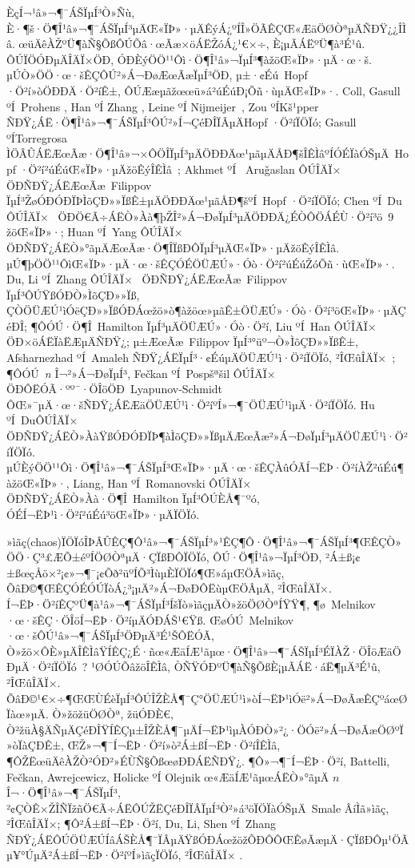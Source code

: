 \documentclass[12pt,openany,CJK,oneside]{cctbook}
\begin{document}
{ÈçÍ¬¹â»¬¶¯ÁŠÏµÍ³Ò»Ñù, È·¶š·Ö¶Î¹â»¬¶¯ÁŠÏµÍ³µÄŒ«ÏÞ»·µÄÊýÁ¿ºÍÎ»ÖÃÊÇŒ«ÆäÖØÒªµÄÑÐŸ¿¿ÎÌâ. œüÄêÀŽºÜ¶àÑ§ÕßÔÚÕâ·œÃæ×öÁËŽóÁ¿¹€×÷, È¡µÃÁËºÜ¶à³É¹û. ÔÚÏÖÓÐµÄÎÄÏ×ÖÐ, ÓÐÈýÖÖ¹¹Ôì·Ö¶Î¹â»¬ÏµÍ³¶àžöŒ«ÏÞ»·µÄ·œ·š. µÚÒ»ÖÖ·œ·šÊÇÔÚ²»Á¬ÐøÆœÃæÏµÍ³ÖÐ, µ±·¢Éú\ Hopf ·Ö²í»òÖÐÐÄ·Ö²íÊ±, ÔÚÆæµãžœœü»á²úÉúÐ¡Õñ·ùµÄŒ«ÏÞ»·. Coll, Gasull ºÍ\ Prohens \cite{Coll}, Han ºÍ Zhang \cite{Han}, Leine ºÍ Nijmeijer\ \cite{Leine}, Zou ºÍKš¹pper\ \cite{Zou} ÑÐŸ¿ÁË·Ö¶Î¹â»¬¶¯ÁŠÏµÍ³ÔÚ²»Í¬ÇéÐÎÏÂµÄHopf ·Ö²íÏÖÏó; Gasull ºÍTorregrosa ÌÖÂÛÁËÆœÃæ·Ö¶Î¹â»¬×ÔÖÎÏµÍ³µÄÖÐÐÄœ¹µãµÄÅÐ¶šÎÊÌâºÍÓÉÏàÓŠµÄ\ Hopf ·Ö²í²úÉúŒ«ÏÞ»·µÄžöÊýÎÊÌâ\ \cite{Gasull}; Akhmet ºÍ \ Aru\v{g}aslan ÔÚÎÄÏ×\ \cite{Akhmet} ÖÐÑÐŸ¿ÁËÆœÃæ\ Filippov ÏµÍ³ŽøÓÐÓÐÏÞÌõÇÐ»»ÏßÊ±µÄÖÐÐÄœ¹µãÅÐ¶šºÍ\ Hopf ·Ö²íÏÖÏó; Chen ºÍ\ Du ÔÚÎÄÏ×\ \cite{Chen} ÖÐÖ€Ã÷ÁËÒ»Àà¶þŽÎ²»Á¬ÐøÏµÍ³µÄÖÐÐÄ¿ÉÒÔÖÁÉÙ·Ö²í³ö\ 9 žöŒ«ÏÞ»·; Huan ºÍ\ Yang ÔÚÎÄÏ×\ \cite{Huan} ÖÐÑÐŸ¿ÁËÒ»°ãµÄÆœÃæ·Ö¶ÎÏßÐÔÏµÍ³µÄŒ«ÏÞ»·µÄžöÊýÎÊÌâ. µÚ¶þÖÖ¹¹ÔìŒ«ÏÞ»·µÄ·œ·šÊÇÓÉÖÜÆÚ»·Óò·Ö²í²úÉúŽóÕñ·ùŒ«ÏÞ»·. Du, Li ºÍ\ Zhang ÔÚÎÄÏ×\ \cite{DuLi,Dulizhang0} ÖÐÑÐŸ¿ÁËÆœÃæ\ Filippov ÏµÍ³ÔÚŸßÓÐÒ»ÌõÇÐ»»Ïß, ÇÒÖÜÆÚ¹ìÓëÇÐ»»ÏßÓÐÁœžö»ò¶àžöœ»µãÊ±ÖÜÆÚ»·Óò·Ö²í³öŒ«ÏÞ»·µÄÇéÐÎ; ¶ÔÓÚ·Ö¶Î\ Hamilton ÏµÍ³µÄÖÜÆÚ»·Óò·Ö²í, Liu ºÍ\ Han ÔÚÎÄÏ×\ \cite{Liu} ÖÐ×öÁËÏàËÆµÄÑÐŸ¿; µ±ÆœÃæ\ Filippov ÏµÍ³°üº¬Ò»ÌõÇÐ»»ÏßÊ±, Afsharnezhad ºÍ\ Amaleh ÑÐŸ¿ÁËÏµÍ³·¢ÉúµÄÖÜÆÚ¹ì·Ö²íÏÖÏó, ²ÎŒûÎÄÏ×\ \cite{Afsharnezhad}; ¶ÔÓÚ\ \emph{n} Î¬²»Á¬ÐøÏµÍ³, Fe\v{c}kan ºÍ\ Pospšª\v{s}il ÔÚÎÄÏ×\ \cite{Feckan2,Feckan3,Feckan4} ÖÐÔËÓÃ·ºº¯·ÖÎöÖÐ\ Lyapunov-Schmidt ÔŒ»¯µÄ·œ·šÑÐŸ¿ÁËÆäÖÜÆÚ¹ì·Ö²íºÍ»¬¶¯ÖÜÆÚ¹ìµÄ·Ö²íÏÖÏó. Hu ºÍ\ DuÔÚÎÄÏ×\ \cite{Hu} ÖÐÑÐŸ¿ÁËÒ»ÀàŸßÓÐÓÐÏÞ¶àÌõÇÐ»»ÏßµÄÆœÃæ²»Á¬ÐøÏµÍ³µÄÖÜÆÚ¹ì·Ö²íÏÖÏó. µÚÈýÖÖ¹¹Ôì·Ö¶Î¹â»¬¶¯ÁŠÏµÍ³Œ«ÏÞ»·µÄ·œ·šÊÇÀûÓÃÍ¬ËÞ·Ö²íÀŽ²úÉú¶àžöŒ«ÏÞ»·, Liang, Han ºÍ\ Romanovski ÔÚÎÄÏ×\ \cite{Liang1,Liang2} ÖÐÑÐŸ¿ÁËÒ»Àà·Ö¶Î\ Hamilton ÏµÍ³ÔÚÈÅ¶¯ºó, ÓÉÍ¬ËÞ¹ì·Ö²í²úÉú³öŒ«ÏÞ»·µÄÏÖÏó.

»ìãç(chaos)ÏÖÏóÎÞÂÛÊÇ¶Ô¹â»¬¶¯ÁŠÏµÍ³»¹ÊÇ¶Ô·Ö¶Î¹â»¬¶¯ÁŠÏµÍ³¶ŒÊÇÒ»ÖÖ·Ç³£ÆÕ±éºÍÖØÒªµÄ·ÇÏßÐÔÏÖÏó, ÔÚ·Ö¶Î¹â»¬ÏµÍ³ÖÐ, ²Á±ß¡¢±ßœçÅö×²¡¢»¬¶¯¡¢Õð²üºÍÕ³ÌùµÈÏÖÏó¶Œ»áµŒÖÂ»ìãç, ÕâÐ©¶ŒÊÇÓÉÓÚÏòÁ¿³¡µÄ²»Á¬ÐøÐÔËùµŒÖÂµÄ, ²ÎŒûÎÄÏ×\;\cite{Dankowicz2, DemeioL, Ing, Kryzhevich, NusseYorke}. Í¬ËÞ·Ö²íÊÇºÜ¶à¹â»¬¶¯ÁŠÏµÍ³ÍšÏò»ìãçµÄÒ»žöÖØÒªÍŸŸ¶, ¶ø\ Melnikov ·œ·šÊÇ·ÖÎöÍ¬ËÞ·Ö²íµÄÓÐÁŠ¹€Ÿß\;\cite{Feckan1, Gruendler, Guck, Meln, Wiggins3}. ŒøÓÚ\ Melnikov ·œ·šÔÚ¹â»¬¶¯ÁŠÏµÍ³ÖÐµÄ³É¹ŠÔËÓÃ, Ò»žö×ÔÈ»µÄÎÊÌâŸÍÊÇ¿É·ñœ«ÆäÍÆ¹ãµœ·Ö¶Î¹â»¬¶¯ÁŠÏµÍ³ÉÏÀŽ·ÖÎöÆäÖÐµÄ·Ö²íÏÖÏó\ ? ¹ØÓÚÕâžöÎÊÌâ, ÒÑŸ­ÓÐºÜ¶àÑ§ÕßÈ¡µÃÁË·áË¶µÄ³É¹û, ²ÎŒûÎÄÏ×\;\cite{Battelli1, Battelli6, Carmona, DuZhang, Granados}. ÕâÐ©¹€×÷¶ŒŒÙÉèÏµÍ³ÔÚÎŽÈÅ¶¯Ç°ÖÜÆÚ¹ì»òÍ¬ËÞ¹ìÓë²»Á¬ÐøÃæÊÇºáœØÏàœ»µÄ. Ò»žöžüÖØÒª, žüÓÐÈ€, Ò²žüÀ§ÄÑµÄÇéÐÎŸÍÊÇµ±ÎŽÈÅ¶¯µÄÍ¬ËÞ¹ìµÀÓÐÒ»²¿·ÖÓë²»Á¬ÐøÃæÖØºÏ»òÏàÇÐÊ±, ŒŽ»¬¶¯Í¬ËÞ·Ö²í»ò²Á±ßÍ¬ËÞ·Ö²íÎÊÌâ, ¶ÔŽËœüÄêÀŽÒ²ÓÐ²»ÉÙÑ§ÕßœøÐÐÁËÑÐŸ¿. ¶Ô»¬¶¯Í¬ËÞ·Ö²í, Battelli, Fe\v{c}kan, Awrejcewicz, Holicke ºÍ \;Olejnik œ«ÆäÍÆ¹ãµœÁËÒ»°ãµÄ \;$n$ Î¬·Ö¶Î¹â»¬¶¯ÁŠÏµÍ³, ²¢ÇÒÊ×ŽÎÑÏžñÖ€Ã÷ÁËÔÚŽËÇéÐÎÏÂÏµÍ³Ò²»á³öÏÖÏàÓŠµÄ\ Smale ÂíÌã»ìãç, ²ÎŒûÎÄÏ×\;\cite{Awrejcewicz2, Battelli2, Battelli3, Battelli4, Feckan1}; ¶Ô²Á±ßÍ¬ËÞ·Ö²í, Du, Li, Shen ºÍ\ Zhang ÑÐŸ¿ÁËÔÚÖÜÆÚÍâÁŠÈÅ¶¯ÏÂµÄŸßÓÐÁœžöžÕÐÔÔŒÊøÃæµÄ·ÇÏßÐÔµ¹ÖÃµ¥°ÚµÄ²Á±ßÍ¬ËÞ·Ö²íºÍ»ìãçÏÖÏó, ²ÎŒûÎÄÏ× \;\cite{DuLiShen,ShenDu}.

}
\end{document}
